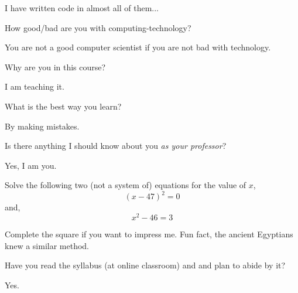 \documentclass{homework}
\begin{document}
\begin{sol}
I have written code in almost all of them...
\end{sol}

\question How good/bad are you with computing-technology?

\begin{sol}
You are not a good computer scientist if you are not bad with technology.
\end{sol}

\question Why are you in this course?

\begin{sol}
I am teaching it.
\end{sol}

\question What is the best way you learn?

\begin{sol}
By making mistakes.
\end{sol}

\question Is there anything I should know about you \textit{as your
  professor}?

\begin{sol}
Yes, I am you.
\end{sol}

\question Solve the following two (not a system of) equations for the
value of $x$,
\[
    (x-47)^2=0
\]
and,
\[
    x^2-46=3
\]

\begin{sol}
Complete the square if you want to impress me. Fun fact, the ancient
Egyptians knew a similar method.
\end{sol}

\question Have you read the syllabus (at online classroom) and and
plan to abide by it?

\begin{sol}
Yes.
\end{sol}
\end{document}
